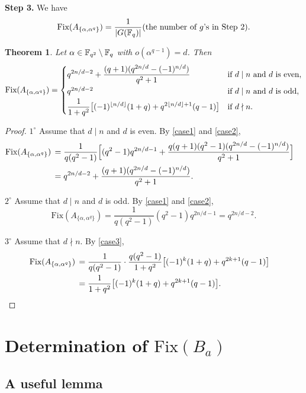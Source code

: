 \documentclass{amsart}
\newtheorem{thm}{Theorem}[section]
\numberwithin{equation}{section}
\theoremstyle{definition}
\newcommand{\f}{\Bbb F}
\begin{document}
\medskip
{\bf Step 3.} We have
\[
\text{Fix}(A_{\{\alpha,\alpha^q\}})=\frac 1{|G(\f_q)|}\text{(the number of $g$'s in Step 2)}.
\]

\begin{thm}\label{T2.2}
Let $\alpha\in\f_{q^2}\setminus\f_q$ with $o(\alpha^{q-1})=d$. Then
\[
\text{\rm Fix}(A_{\{\alpha,\alpha^q\}})=\begin{cases}
\displaystyle q^{2n/d-2}+\frac{(q+1)(q^{2n/d}-(-1)^{n/d})}{q^2+1}&\text{if $d\mid n$ and $d$ is even},\vspace{0.2em}\cr
q^{2n/d-2}&\text{if $d\mid n$ and $d$ is odd},\vspace{0.2em}\cr
\displaystyle \frac 1{1+q^2}\bigl[(-1)^{\lfloor n/d\rfloor}(1+q)+q^{2\lfloor n/d\rfloor+1}(q-1)\bigr]&\text{if $d\nmid n$}.
\end{cases}
\]
\end{thm}

\begin{proof}
$1^\circ$ Assume that $d\mid n$ and $d$ is even. By \eqref{case1} and \eqref{case2},
\begin{align*}
\text{Fix}(A_{\{\alpha,\alpha^q\}})\,&=\frac1{q(q^2-1)}\Bigl[(q^2-1)q^{2n/d-1}+\frac{q(q+1)(q^2-1)(q^{2n/d}-(-1)^{n/d})}{q^2+1}\Bigr]\cr
&=q^{2n/d-2}+\frac{(q+1)(q^{2n/d}-(-1)^{n/d})}{q^2+1}.
\end{align*}

\medskip
$2^\circ$ Assume that $d\mid n$ and $d$ is odd. By \eqref{case1} and \eqref{case2},
\[
\text{Fix}(A_{\{\alpha,\alpha^q\}})=\frac1{q(q^2-1)}(q^2-1)q^{2n/d-1}=q^{2n/d-2}.
\]

\medskip
$3^\circ$ Assume that $d\nmid n$. By \eqref{case3},
\begin{align*}
\text{Fix}(A_{\{\alpha,\alpha^q\}})\,&=\frac1{q(q^2-1)}\cdot\frac{q(q^2-1)}{1+q^2}\bigl[(-1)^k(1+q)+q^{2k+1}(q-1)\bigr]\cr
&=\frac 1{1+q^2}\bigl[(-1)^k(1+q)+q^{2k+1}(q-1)\bigr].
\end{align*}
\end{proof}



\section{Determination of $\text{Fix}(B_a)$}

\subsection{A useful lemma}\
\end{document}
